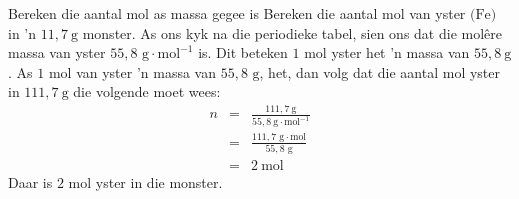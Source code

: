       \begin{wex}{Bereken die aantal mol as massa gegee is}{
      \label{m38717*id276776} Bereken die aantal mol van yster $\text{(Fe)}$ in 'n $11,7 ~\text{g}$ monster.  }
{
As ons kyk na die periodieke tabel, sien ons dat die molêre massa van yster $55,8 \text{ g} \cdot \text{mol}^{-1}$ is. Dit beteken $1$ mol yster het 'n massa van $55,8 ~\text{g}$.
      \label{m38717*id276848}As $1$ mol van yster 'n massa van $55,8 \text{ g}$, het, dan volg dat die aantal mol yster in $111,7 ~\text{g}$  die volgende moet wees: 
\begin{eqnarray*}
n & = & \frac{111,7 ~\text{g}}{55,8 ~\text{g} \cdot{\text{mol}}^{-1}} \\
 & = & \frac{111,7 \text{ g} \cdot \text{mol}}{55,8 \text{ g}} \\
 & = & 2 ~\text{mol}
\end{eqnarray*}
Daar is $2$ mol yster in die monster.
}
    \end{wex}

